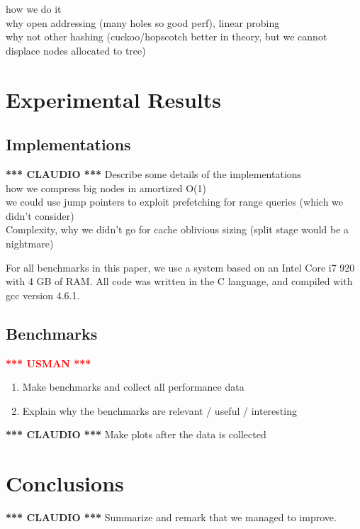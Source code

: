 \documentclass{article}
\newcommand{\usman}{\textcolor{Red}{\textbf{*** USMAN ***} }}
\newcommand{\claudio}{\textcolor{Cerulean}{\textbf{*** CLAUDIO ***} }}
\begin{document}
how we do it \\
why open addressing (many holes so good perf), linear probing \\
why not other hashing (cuckoo/hopscotch better in theory, but we cannot displace nodes allocated to tree) \\


\section{Experimental Results}

\subsection{Implementations}
\claudio
Describe some details of the implementations \\
how we compress big nodes in amortized O(1)\\
we could use jump pointers to exploit prefetching for range queries (which we didn't consider) \citep{Chen:2001} \\
Complexity, why we didn't go for cache oblivious sizing (split stage would be a nightmare)

For all benchmarks in this paper, we use a system based on an Intel Core i7 920 with 4 GB of RAM.
All code was written in the C language, and compiled with gcc version 4.6.1.

\subsection{Benchmarks}
\usman
\begin{enumerate}
	\item Make benchmarks and collect all performance data
	\item Explain why the benchmarks are relevant / useful / interesting
\end{enumerate}
\claudio
Make plots after the data is collected


\section{Conclusions}
\claudio
Summarize and remark that we managed to improve.

\small



\end{document}
